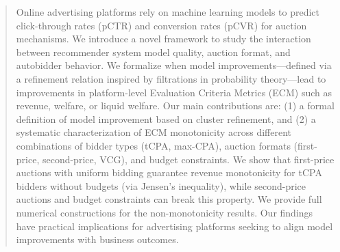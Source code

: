 \documentclass{article}
\theoremstyle{plain}
\theoremstyle{definition}
\theoremstyle{remark}
\begin{document}

\printAffiliationsAndNotice{}

\begin{abstract}
Online advertising platforms rely on machine learning models to predict click-through rates (pCTR) and conversion rates (pCVR) for auction mechanisms. We introduce a novel framework to study the interaction between recommender system model quality, auction format, and autobidder behavior. We formalize when model improvements---defined via a refinement relation inspired by filtrations in probability theory---lead to improvements in platform-level Evaluation Criteria Metrics (ECM) such as revenue, welfare, or liquid welfare. Our main contributions are: (1) a formal definition of model improvement based on cluster refinement, and (2) a systematic characterization of ECM monotonicity across different combinations of bidder types (tCPA, max-CPA), auction formats (first-price, second-price, VCG), and budget constraints. We show that first-price auctions with uniform bidding guarantee revenue monotonicity for tCPA bidders without budgets (via Jensen's inequality), while second-price auctions and budget constraints can break this property. We provide full numerical constructions for the non-monotonicity results. Our findings have practical implications for advertising platforms seeking to align model improvements with business outcomes.
\end{abstract}




\end{document}
